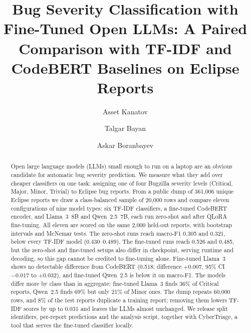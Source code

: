 \documentclass[a4paper,fleqn]{cas-sc}
\begin{document}
\let\WriteBookmarks\relax


\title[mode=title]{Bug Severity Classification with Fine-Tuned Open LLMs: A Paired
Comparison with TF-IDF and CodeBERT Baselines on Eclipse Reports}

\author[1]{Asset Kanatov}


\author[1]{Talgar Bayan}

\author[1]{Askar Boranbayev}
\cormark[1]


\begin{abstract}
Open large language models (LLMs) small enough to run on a laptop are an obvious
candidate for automatic bug severity prediction. We measure what they add over cheaper
classifiers on one task: assigning one of four Bugzilla severity levels (Critical,
Major, Minor, Trivial) to Eclipse bug reports. From a public dump of 361,006 unique
Eclipse reports we draw a class-balanced sample of 20,000 rows and compare eleven
configurations of nine model types: six TF-IDF classifiers, a fine-tuned CodeBERT
encoder, and Llama~3~8B and Qwen~2.5~7B, each run zero-shot and after QLoRA fine-tuning.
All eleven are scored on the same 2,000 held-out reports, with bootstrap intervals and
McNemar tests. The zero-shot runs reach macro-F1 0.305 and 0.321, below every TF-IDF
model (0.430--0.489). The fine-tuned runs reach 0.526 and 0.485, but the zero-shot and
fine-tuned setups also differ in checkpoint, serving runtime and decoding, so this gap
cannot be credited to fine-tuning alone. Fine-tuned Llama~3 shows no detectable
difference from CodeBERT (0.518; difference $+0.007$, 95\% CI $-0.017$ to $+0.032$),
and fine-tuned Qwen~2.5 is below it on macro-F1. The models differ more by class than in aggregate:
fine-tuned Llama~3 finds 36\% of Critical reports, Qwen~2.5 finds 69\% but only 21\% of
Minor ones. The dump repeats 60,000 rows, and 8\% of the test reports duplicate a
training report; removing them lowers TF-IDF scores by up to 0.031 and leaves the LLMs
almost unchanged. We release split identifiers, per-report predictions and the analysis
script, together with CyberTriage, a tool that serves the fine-tuned classifier locally.
\end{abstract}
\end{document}
